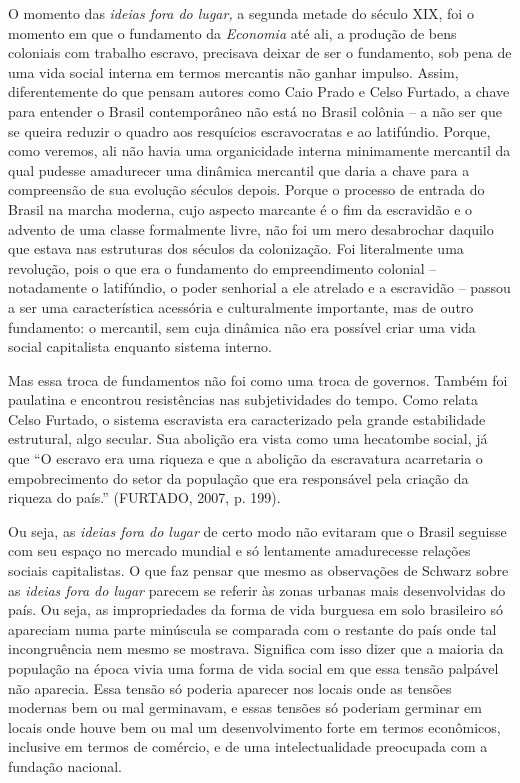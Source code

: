 O momento das \emph{ideias fora do lugar,} a segunda metade do século
XIX, foi o momento em que o fundamento da \emph{Economia} até ali, a
produção de bens coloniais com trabalho escravo, precisava deixar de ser
o fundamento, sob pena de uma vida social interna em termos mercantis
não ganhar impulso. Assim, diferentemente do que pensam autores como
Caio Prado e Celso Furtado, a chave para entender o Brasil contemporâneo
não está no Brasil colônia -- a não ser que se queira reduzir o quadro
aos resquícios escravocratas e ao latifúndio. Porque, como veremos, ali
não havia uma organicidade interna minimamente mercantil da qual pudesse
amadurecer uma dinâmica mercantil que daria a chave para a compreensão
de sua evolução séculos depois. Porque o processo de entrada do Brasil
na marcha moderna, cujo aspecto marcante é o fim da escravidão e o
advento de uma classe formalmente livre, não foi um mero desabrochar
daquilo que estava nas estruturas dos séculos da colonização. Foi
literalmente uma revolução, pois o que era o fundamento do
empreendimento colonial -- notadamente o latifúndio, o poder senhorial a
ele atrelado e a escravidão -- passou a ser uma característica acessória
e culturalmente importante, mas de outro fundamento: o mercantil, sem
cuja dinâmica não era possível criar uma vida social capitalista
enquanto sistema interno.

Mas essa troca de fundamentos não foi como uma troca de governos. Também
foi paulatina e encontrou resistências nas subjetividades do tempo. Como
relata Celso Furtado, o sistema escravista era caracterizado pela grande
estabilidade estrutural, algo secular. Sua abolição era vista como uma
hecatombe social, já que ``O escravo era uma riqueza e que a abolição da
escravatura acarretaria o empobrecimento do setor da população que era
responsável pela criação da riqueza do país.'' (FURTADO, 2007, p. 199).

Ou seja, as \emph{ideias fora do lugar} de certo modo não evitaram que o
Brasil seguisse com seu espaço no mercado mundial e só lentamente
amadurecesse relações sociais capitalistas. O que faz pensar que mesmo
as observações de Schwarz sobre as \emph{ideias fora do lugar} parecem
se referir às zonas urbanas mais desenvolvidas do país. Ou seja, as
impropriedades da forma de vida burguesa em solo brasileiro só apareciam
numa parte minúscula se comparada com o restante do país onde tal
incongruência nem mesmo se mostrava. Significa com isso dizer que a
maioria da população na época vivia uma forma de vida social em que essa
tensão palpável não aparecia. Essa tensão só poderia aparecer nos locais
onde as tensões modernas bem ou mal germinavam, e essas tensões só
poderiam germinar em locais onde houve bem ou mal um desenvolvimento
forte em termos econômicos, inclusive em termos de comércio, e de uma
intelectualidade preocupada com a fundação nacional.

